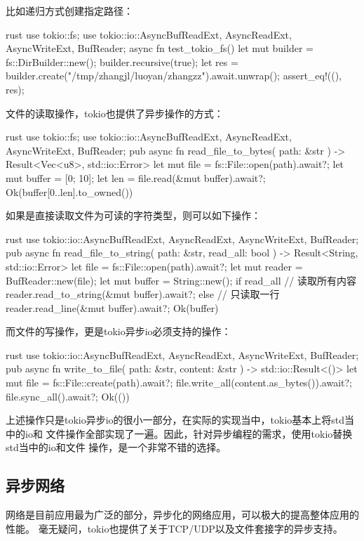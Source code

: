 比如递归方式创建指定路径：
\begin{code-block}{rust}
use tokio::fs;
use tokio::io::{AsyncBufReadExt, AsyncReadExt, AsyncWriteExt, BufReader};
async fn test_tokio_fs() {
    let mut builder = fs::DirBuilder::new();
    builder.recursive(true);
    let res = builder.create("/tmp/zhangjl/luoyan/zhangzz").await.unwrap();
    assert_eq!((), res);
}
\end{code-block}

文件的读取操作，tokio也提供了异步操作的方式：
\begin{code-block}{rust}
use tokio::fs;
use tokio::io::{AsyncBufReadExt, AsyncReadExt, AsyncWriteExt, BufReader};
pub async fn read_file_to_bytes(
    path: &str
) -> Result<Vec<u8>, std::io::Error> {
    let mut file = fs::File::open(path).await?;
    let mut buffer = [0; 10];
    let len = file.read(&mut buffer).await?;
    Ok(buffer[0..len].to_owned())
}
\end{code-block}

如果是直接读取文件为可读的字符类型，则可以如下操作：
\begin{code-block}{rust}
use tokio::io::{AsyncBufReadExt, AsyncReadExt, AsyncWriteExt, BufReader};
pub async fn read_file_to_string(
    path: &str, read_all: bool
) -> Result<String, std::io::Error> {
    let file = fs::File::open(path).await?;
    let mut reader = BufReader::new(file);
    let mut buffer = String::new();
    if read_all {
        // 读取所有内容
        reader.read_to_string(&mut buffer).await?;
    } else {
        // 只读取一行
        reader.read_line(&mut buffer).await?;
    }
    Ok(buffer)
}
\end{code-block}

而文件的写操作，更是tokio异步io必须支持的操作：
\begin{code-block}{rust}
use tokio::io::{AsyncBufReadExt, AsyncReadExt, AsyncWriteExt, BufReader};
pub async fn write_to_file(
    path: &str, content: &str
) -> std::io::Result<()> {
    let mut file = fs::File::create(path).await?;
    file.write_all(content.as_bytes()).await?;
    file.sync_all().await?;
    Ok(())
}
\end{code-block}
上述操作只是tokio异步io的很小一部分，在实际的实现当中，tokio基本上将std当中的io和
文件操作全部实现了一遍。因此，针对异步编程的需求，使用tokio替换std当中的io和文件
操作，是一个非常不错的选择。

\subsection{异步网络}
网络是目前应用最为广泛的部分，异步化的网络应用，可以极大的提高整体应用的性能。
毫无疑问，tokio也提供了关于TCP/UDP以及文件套接字的异步支持。

